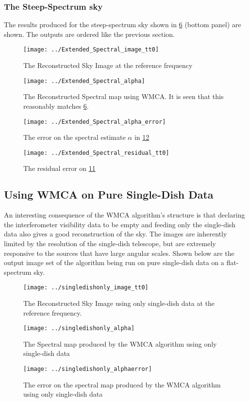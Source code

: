 \documentclass[twocolumn]{aastex61}
\begin{document}
\subsubsection{The Steep-Spectrum sky}
The results produced for the steep-spectrum sky shown in \hyperref[ 6]{\figurename{ 6}} (bottom panel) are shown. The outputs are ordered like the previous section.
\begin{figure}[H]
\centering
\texttt{[image: ../Extended\_Spectral\_image\_tt0]}
\caption{The Reconstructed Sky Image at the reference frequency}
\label{ 11}
\end{figure}
\begin{figure}[H]
\centering
\texttt{[image: ../Extended\_Spectral\_alpha]}
\caption{The Reconstructed Spectral map using WMCA. It is seen that this reasonably matches \hyperref[ 6]{\figurename{ 6}}.}
\label{ 12}
\end{figure}
\begin{figure}[H]
\centering
\texttt{[image: ../Extended\_Spectral\_alpha\_error]}
\caption{The error on the spectral estimate $\alpha$ in \hyperref[ 12]{\figurename{ 12}}}
\label{ 13}
\end{figure}
\begin{figure}[H]
\centering
\texttt{[image: ../Extended\_Spectral\_residual\_tt0]}
\caption{The residual error on \hyperref[ 11]{\figurename{ 11}}}
\label{ 14}
\end{figure}
\subsection{Using WMCA on Pure Single-Dish Data}
An interesting consequence of the WMCA algorithm's structure is that declaring the interferometer visibility data to be empty and feeding only the single-dish data also gives a good reconstruction of the sky. The images are inherently limited by the resolution of the single-dish telescope, but are extremely responsive to the sources that have large angular scales. Shown below are the output image set of the algorithm being run on pure single-dish data on a flat-spectrum sky. 
\begin{figure}[H]
\centering
\texttt{[image: ../singledishonly\_image\_tt0]}
\caption{The Reconstructed Sky Image using only single-dish data at the reference frequency.}
\label{ 15}
\end{figure}
\begin{figure}[H]
\centering
\texttt{[image: ../singledishonly\_alpha]}
\caption{The Spectral map produced by the WMCA algorithm using only single-dish data}
\label{ 16}
\end{figure}
\begin{figure}[H]
\centering
\texttt{[image: ../singledishonly\_alphaerror]}
\caption{The error on the spectral map produced by the WMCA algorithm using only single-dish data}
\label{ 17}
\end{figure}
\end{document}
